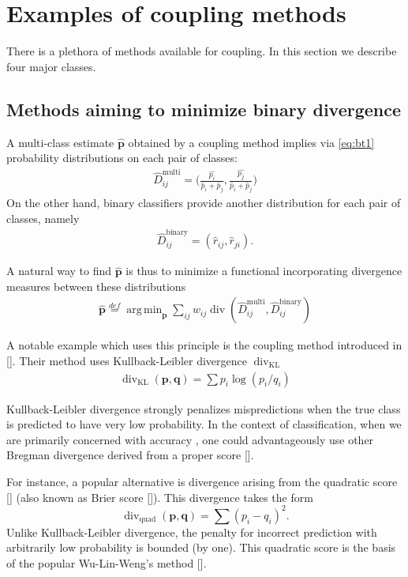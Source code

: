 \documentclass[twoside,11pt]{article}
\DeclareMathOperator*{\divm}{div}
\DeclareMathOperator*{\argmin}{arg\,min}
\begin{document}
\section{Examples of coupling methods} \label{sec:coupling}

There is a plethora of methods available for coupling. In this section we describe four major classes.

\subsection{Methods aiming to minimize binary divergence}

A multi-class estimate $\hat{\boldsymbol{p}}$ obtained by a coupling method implies via \eqref{eq:bt1} probability distributions on each pair of classes:
\begin{align*}
	\hat D_{ij}^\textrm{multi}= \biggl(\frac{\hat{p_i}}{\hat p_i + \hat p_j},\frac{\hat{p_j}}{\hat p_i + \hat p_j}\biggr)	
\end{align*}
On the other hand, binary classifiers provide another distribution for each pair of  classes, namely
\begin{align*}
\hat D_{ij}^\textrm{binary} = (\hat r_{ij}, \hat r_{ji}).
\end{align*}

A natural way to find  $\hat{\boldsymbol{p}}$ is thus to minimize a functional incorporating divergence measures between these distributions
\begin{align*}
\hat{\boldsymbol{p}} \stackrel{def}{=} \argmin_{\boldsymbol{p}} \sum_{ij} w_{ij} \divm (\hat D_{ij}^\textrm{multi}, \hat D_{ij}^\textrm{binary})
\end{align*}

A notable example which uses this principle is the coupling method introduced in [\cite{hastie1998classification}]. Their method uses Kullback-Leibler divergence $\divm_\textrm{KL}$
\begin{align*}
	\divm\nolimits_\textrm{KL} (\boldsymbol{p}, \boldsymbol{q})= \sum p_i \log (p_i/ q_i)
\end{align*}

Kullback-Leibler divergence strongly penalizes  mispredictions when the true class is predicted to have very low probability. In the context of classification, when we are primarily concerned with accuracy , one could advantageously use other Bregman divergence derived from a proper score [\cite{gneiting2007strictly, buja2005loss}].
 
For instance, a popular alternative is divergence arising from the quadratic  score [\cite{gneiting2007strictly}] (also known as Brier score [\cite{brier1950verification}]). This divergence takes the form
$$
\divm\nolimits_\textrm{quad} (\boldsymbol{p}, \boldsymbol{q})= \sum (p_i - q_i)^2.
$$
Unlike Kullback-Leibler divergence, the penalty for incorrect prediction with arbitrarily low probability is bounded (by one). This quadratic score is the basis of the popular Wu-Lin-Weng's method [\cite{wu2004probability}]. 
\end{document}
